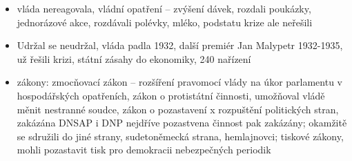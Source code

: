 \documentclass{article}
\begin{document}
\begin{itemize}
    \item vláda nereagovala, vládní opatření -- zvýšení dávek, rozdali poukázky, jednorázové akce, rozdávali polévky, mléko, podstatu krize ale neřešili
    \item Udržal se neudržal, vláda padla 1932, další premiér Jan Malypetr 1932-1935, už řešili krizi, státní zásahy do ekonomiky, 240 nařízení
    \item zákony: zmocňovací zákon -- rozšíření pravomocí vlády na úkor parlamentu v hospodářských opatřeních, zákon o protistátní činnosti, umožňoval vládě měnit nestranné soudce, zákon o pozastavení x rozpuštění politických stran, zakázána DNSAP i DNP nejdříve pozastvena činnost pak zakázány; okamžitě se sdružili do jiné strany, sudetoněmecká strana, hemlajnovci; tiskové zákony, mohli pozastavit tisk pro demokracii nebezpečných periodik
\end{itemize}
\end{document}
